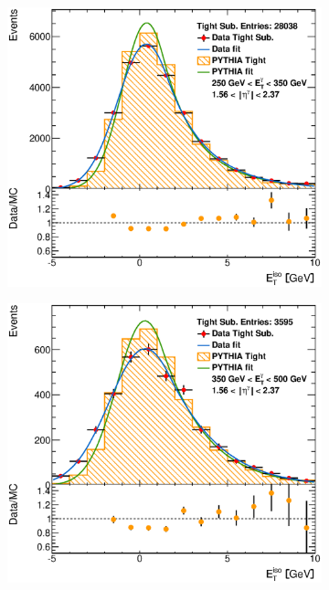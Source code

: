 \documentclass[12pt, twoside]{article}
\numberwithin{equation}{section}
\numberwithin{figure}{section}
\newenvironment{changemargin}[2]{%
\begin{list}{}{%
\setlength{\topsep}{0pt}%
\setlength{\leftmargin}{#1}%
\setlength{\rightmargin}{#2}%
\setlength{\listparindent}{\parindent}%
\setlength{\itemindent}{\parindent}%
\setlength{\parsep}{\parskip}%
}%
\item[]}{\end{list}}
\begin{document}
\begin{figure}[H]
\begin{changemargin}{-1.0cm}{-0.75cm}
\begin{changemargin}{-0.75cm}{-1.0cm}
        \hspace{-0.287\textwidth}
        \begin{subfigure}[b]{0.27\textwidth}
            \includegraphics[width=\textwidth]{./images/EtISOCorrection/T_MC_FITS-33(10GeV)(After).eps}
        \end{subfigure}
        \begin{subfigure}[b]{0.27\textwidth}
            \includegraphics[width=\textwidth]{./images/EtISOCorrection/T_MC_FITS-34(10GeV)(After).eps}

\end{subfigure}
\end{changemargin}
\end{changemargin}
\end{figure}
\end{document}
